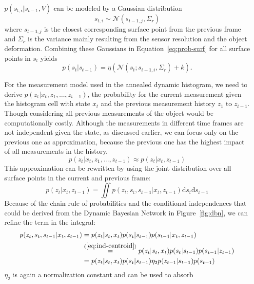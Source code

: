 \documentclass[twoside,a4paper,article]{combine}
\begin{document}
$p(s_{t,i}|s_{t-1},V)$ can be modeled by a
Gaussian distribution
\begin{equation}
\label{eq:gaus-st-i}
s_{t,i} \sim \mathcal{N}(s_{t-1,j},\Sigma_r)
\end{equation}
where $s_{t-1,j}$ is the closest corresponding surface point from the
previous frame and $\Sigma_r$ is the variance mainly resulting from
the sensor resolution and the object deformation. Combining these
Gaussians in Equation~\ref{eq:prob-surf} for all surface points in
$s_t$ yields
\begin{equation}
\label{eq:gaus-st}
p(s_{t}|s_{t-1}) = \eta(\mathcal{N}(s_t;s_{t-1,i},\Sigma_r) + k) \mathrm{ . }
\end{equation}

For the measurement model used in the annealed dynamic histogram, we
need to derive $p(z_t|x_t,z_1,...,z_{t-1})$, the probability for the
current measurement given the histogram cell with state $x_t$ and the
previous measurement history $z_1$ to $z_{t-1}$. Though considering all
previous measurements of the object would be computationally
costly. Although the measurements in different time frames are not
independent given the state, as discussed earlier, we can focus only
on the previous one as approximation, because the previous one has the
highest impact of all measurements in the history.
\begin{equation}
p(z_t|x_t,z_1,...,z_{t-1}) \approx p(z_t|x_t,z_{t-1})
\end{equation}
This approximation can be rewritten by using the joint distribution over
all surface points in the current and previous frame:
\begin{equation}
\label{eq:mm-iint}
p(z_t|x_t,z_{t-1}) = \iint p(z_t,s_t,s_{t-1}|x_t,z_{t-1}) \mathrm d
s_t \mathrm d s_{t-1}
\end{equation}
Because of the chain rule of probabilities and the conditional
independences that could be derived from the Dynamic Bayesian Network
in Figure~\ref{fig:dbn}, we can refine the term in the integral:
\begin{align}
p(z_t,s_t,s_{t-1}|x_t,z_{t-1})
&= p(z_t|s_t,x_t)p(s_t|s_{t-1})p(s_{t-1}|x_t,z_{t-1})\nonumber\\
&\overset{(\ref{eq:ind-centroid})}{=} p(z_t|s_t,x_t)p(s_t|s_{t-1})p(s_{t-1}|z_{t-1})\nonumber\\
&= p(z_t|s_t,x_t)p(s_t|s_{t-1})\eta_2p(z_{t-1}|s_{t-1})p(s_{t-1})
\end{align}
$\eta_2$ is again a normalization constant and can be used to absorb
\end{document}
